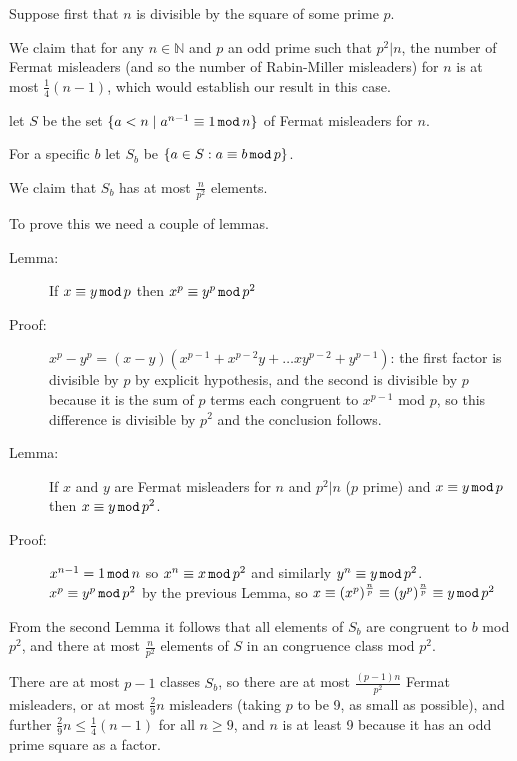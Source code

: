 \documentclass[12pt]{article}
\begin{document}
Suppose first that $n$ is divisible by the square of some prime $p$.

We claim that for any $n \in {\mathbb N}$ and $p$  an odd prime such that $p^2 | n$, the number of Fermat misleaders (and so the number of Rabin-Miller misleaders) for $n$ is
at most $\frac 14(n-1)$, which would establish our result in this case.

  let $S$ be the set $\{a < n \mid a^{n-1} \equiv 1\, {\tt mod}\, n\}$ of Fermat misleaders for $n$.

For a specific $b$ let $S_b$ be $\{a \in S:a \equiv b\,{\tt mod}\, p\}$.

We claim that $S_b$ has at most $\frac n{p^2}$ elements.

To prove this we need a couple of lemmas.

\begin{description}

\item [Lemma:]  If $x \equiv y\, {\tt mod}\,p$ then $x^p\equiv y^p\,{\tt mod}\,p^2$

\item[Proof:]  $x^p-y^p=(x-y)(x^{p-1}+x^{p-2}y+\ldots xy^{p-2}+y^{p-1})$:  the first factor is divisible by $p$ by explicit hypothesis, and the second is divisible by $p$ because it is the sum of $p$
terms each congruent to $x^{p-1}$ mod $p$, so this difference is divisible by $p^2$ and the conclusion follows.

\item[Lemma:]  If $x$ and $y$ are Fermat misleaders for $n$ and $p^2 | n$ ($p$ prime) and $x \equiv y \,{\tt mod} \,p$ then $x \equiv y\, {\tt mod} \,p^2$.

\item[Proof:]  $x^{n-1}=1\,{\tt mod} \,n$ so $x^n\equiv x\,{\tt mod}\,p^2$ and similarly $y^n\equiv y\,{\tt mod}\,p^2$.  $x^p \equiv  y^p\,{\tt mod}\, p^2$ by the previous Lemma, so $x \equiv (x^p)^{\frac np} \equiv (y^p)^{\frac np} \equiv y \,{\tt mod}\,p^2$

\end{description}

From the second Lemma it follows that all elements of $S_b$ are congruent to $b$ mod $p^2$, and there at most  $\frac n{p^2}$ elements of $S$ in an congruence class mod $p^2$.

There are at most $p-1$ classes $S_b$, so there are at most $\frac{(p-1)n}{p^2}$ Fermat misleaders,
or at most $\frac29n$ misleaders (taking $p$ to be 9, as small as possible), and further $\frac 29n \leq \frac14(n-1)$ for
all $n \geq 9$, and $n$ is at least 9 because it has an odd prime square as a factor.
\end{document}
